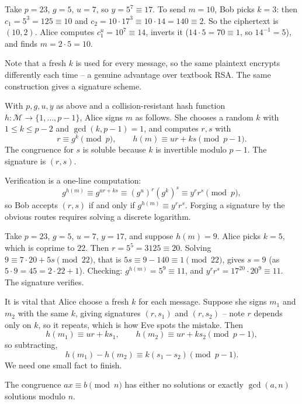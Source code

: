 \documentclass[a4paper]{scrartcl}
\newcommand{\Mc}{\mathcal{M}}
\begin{document}
\begin{example}
	Take $p = 23$, $g = 5$, $u = 7$, so $y = 5^7 \equiv 17$. To send $m = 10$, Bob picks $k = 3$: then $c_1 = 5^3 = 125\equiv10$ and $c_2 = 10\cdot17^3 \equiv 10\cdot14 = 140\equiv2$. So the ciphertext is $(10,2)$. Alice computes $c_1^u = 10^7\equiv14$, inverts it ($14\cdot5 = 70\equiv1$, so $14^{-1}=5$), and finds $m = 2\cdot5 = 10$. 
\end{example}

Note that a fresh $k$ is used for every message, so the same plaintext encrypts differently each time -- a genuine advantage over textbook RSA. The same construction gives a signature scheme.

\begin{definition}
	With $p,g,u,y$ as above and a collision-resistant hash function $h\colon\Mc\to\{1,\dots,p-1\}$, Alice signs $m$ as follows. She chooses a random $k$ with $1\le k\le p-2$ and $\gcd(k,p-1)=1$, and computes $r,s$ with
	$$r \equiv g^k \pmod p, \qquad h(m)\equiv ur+ks \pmod{p-1}.$$
	The congruence for $s$ is soluble because $k$ is invertible modulo $p-1$. The signature is $(r,s)$.
\end{definition}

Verification is a one-line computation:
$$g^{h(m)} \equiv g^{ur+ks} \equiv (g^u)^r(g^k)^s \equiv y^rr^s\pmod p,$$
so Bob accepts $(r,s)$ if and only if $g^{h(m)}\equiv y^rr^s$. Forging a signature by the obvious routes requires solving a discrete logarithm.

\begin{example}
	Take $p = 23$, $g = 5$, $u = 7$, $y = 17$, and suppose $h(m) = 9$. Alice picks $k = 5$, which is coprime to $22$. Then $r = 5^5 = 3125 \equiv 20$. Solving $9 \equiv 7\cdot20+5s \pmod{22}$, that is $5s \equiv 9 - 140 \equiv 1 \pmod{22}$, gives $s = 9$ (as $5\cdot9 = 45 = 2\cdot22+1$). Checking: $g^{h(m)} = 5^9 \equiv 11$, and $y^rr^s = 17^{20}\cdot20^9\equiv11$. The signature verifies.
\end{example}

It is vital that Alice choose a fresh $k$ for each message. Suppose she signs $m_1$ and $m_2$ with the same $k$, giving signatures $(r,s_1)$ and $(r,s_2)$ -- note $r$ depends only on $k$, so it repeats, which is how Eve spots the mistake. Then
$$h(m_1)\equiv ur+ks_1, \qquad h(m_2)\equiv ur+ks_2 \pmod{p-1},$$
so subtracting,
$$h(m_1)-h(m_2)\equiv k(s_1-s_2)\pmod{p-1}.$$
We need one small fact to finish.

\begin{lemma}\label{lem:lincong}
	The congruence $ax\equiv b\pmod n$ has either no solutions or exactly $\gcd(a,n)$ solutions modulo $n$.
\end{lemma}
\end{document}
